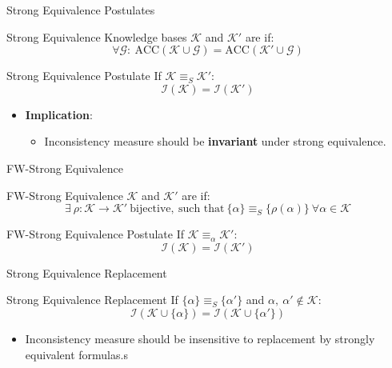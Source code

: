 \begin{frame}{Strong Equivalence Postulates}
    \begin{block}{Strong Equivalence}
        Knowledge bases \( \mathcal{K} \) and \( \mathcal{K}' \) are  if:
        \[
            \forall \mathcal{G}:\ \text{ACC}(\mathcal{K} \cup \mathcal{G}) = \text{ACC}(\mathcal{K}' \cup \mathcal{G})
        \]
    \end{block}
    \begin{block}{Strong Equivalence Postulate}
        If \( \mathcal{K} \equiv_S \mathcal{K}' \):
        \[
            \mathcal{I}(\mathcal{K}) = \mathcal{I}(\mathcal{K}')
        \]
    \end{block}
    \begin{itemize}
        \item \textbf{Implication}:
              \begin{itemize}
                  \item Inconsistency measure should be \textbf{invariant} under strong equivalence.
              \end{itemize}
    \end{itemize}
\end{frame}

\begin{frame}{FW-Strong Equivalence}
    \begin{block}{FW-Strong Equivalence}
        \(\mathcal{K}\) and \(\mathcal{K}'\) are  if:
        \[
            \exists\ \rho : \mathcal{K} \rightarrow \mathcal{K}'\ \text{bijective},\ \text{such that}\ \{\alpha\} \equiv_S \{\rho(\alpha)\}\ \forall \alpha \in \mathcal{K}
        \]
    \end{block}
    \begin{block}{FW-Strong Equivalence Postulate}
        If \(\mathcal{K} \equiv_{\alpha} \mathcal{K}'\):
        \[
            \mathcal{I}(\mathcal{K}) = \mathcal{I}(\mathcal{K}')
        \]
    \end{block}
\end{frame}

\begin{frame}{Strong Equivalence Replacement}
    \begin{block}{Strong Equivalence Replacement}
        If \(\{\alpha\} \equiv_S \{\alpha'\}\) and \(\alpha,\ \alpha' \notin \mathcal{K}\):
        \[
            \mathcal{I}(\mathcal{K} \cup \{\alpha\}) = \mathcal{I}(\mathcal{K} \cup \{\alpha'\})
        \]
    \end{block}
    \begin{itemize}
        \item Inconsistency measure should be insensitive to replacement by strongly equivalent formulas.s
    \end{itemize}
\end{frame}

